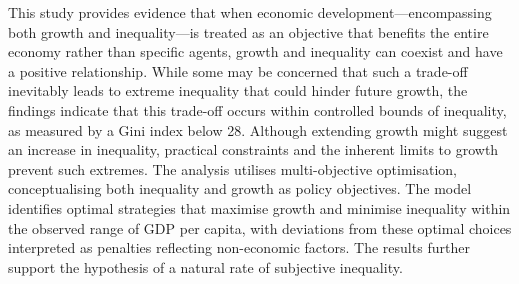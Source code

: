 This study provides evidence that when economic development—encompassing both growth and inequality—is treated as an objective that benefits the entire economy rather than specific agents, growth and inequality can coexist and have a positive relationship. While some may be concerned that such a trade-off inevitably leads to extreme inequality that could hinder future growth, the findings indicate that this trade-off occurs within controlled bounds of inequality, as measured by a Gini index below 28. Although extending growth might suggest an increase in inequality, practical constraints and the inherent limits to growth prevent such extremes. The analysis utilises multi-objective optimisation, conceptualising both inequality and growth as policy objectives. The model identifies optimal strategies that maximise growth and minimise inequality within the observed range of GDP per capita, with deviations from these optimal choices interpreted as penalties reflecting non-economic factors. The results further support the hypothesis of a natural rate of subjective inequality.